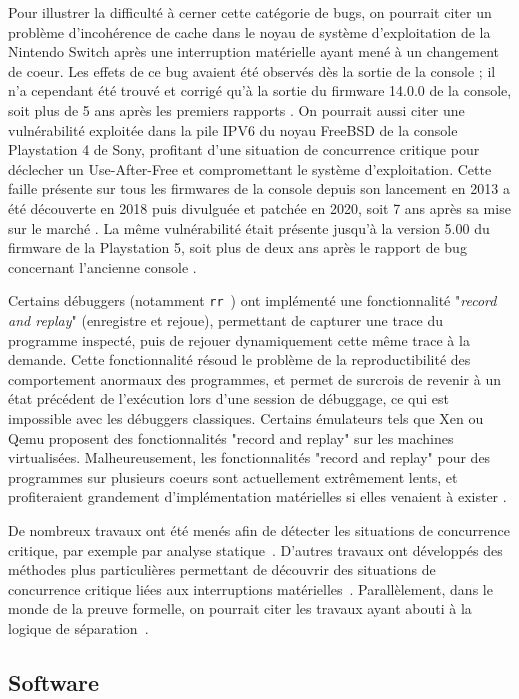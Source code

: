 Pour illustrer la difficulté à cerner cette catégorie de bugs, on pourrait citer un problème d'incohérence de cache dans le noyau de système d'exploitation de la Nintendo Switch après une interruption matérielle ayant mené à un changement de coeur. Les effets de ce bug avaient été observés dès la sortie de la console ; il n'a cependant été trouvé et corrigé qu'à la sortie du firmware 14.0.0 de la console, soit plus de 5 ans après les premiers rapports \cite{switchbug}.
On pourrait aussi citer une vulnérabilité exploitée dans la pile IPV6 du noyau FreeBSD de la console Playstation 4 de Sony, profitant d'une situation de concurrence critique pour déclecher un Use-After-Free et compromettant le système d'exploitation. Cette faille présente sur tous les firmwares de la console depuis son lancement en 2013 a été découverte en 2018 puis divulguée et patchée en 2020, soit 7 ans après sa mise sur le marché \cite{ps4bug}. La même vulnérabilité était présente jusqu'à la version 5.00 du firmware de la Playstation 5, soit plus de deux ans après le rapport de bug concernant l'ancienne console \cite{ps5bug}.

Certains débuggers (notamment \texttt{rr}~\cite{mozRR}) ont implémenté une fonctionnalité "\emph{record and replay}" (enregistre et rejoue), permettant de capturer une trace du programme inspecté, puis de rejouer dynamiquement cette même trace à la demande. Cette fonctionnalité résoud le problème de la reproductibilité des comportement anormaux des programmes, et permet de surcrois de revenir à un état précédent de l'exécution lors d'une session de débuggage, ce qui est impossible avec les débuggers classiques. Certains émulateurs tels que Xen ou Qemu proposent des fonctionnalités "record and replay" sur les machines virtualisées. Malheureusement, les fonctionnalités "record and replay" pour des programmes sur plusieurs coeurs sont actuellement extrêmement lents, et profiteraient grandement d'implémentation matérielles si elles venaient à exister \cite{mozRR}.

De nombreux travaux ont été menés afin de détecter les situations de concurrence critique, par exemple par analyse statique~\cite{racerX}. D'autres travaux ont développés des méthodes plus particulières permettant de découvrir des situations de concurrence critique liées aux interruptions matérielles~\cite{sdracer}. Parallèlement, dans le monde de la preuve formelle, on pourrait citer les travaux ayant abouti à la logique de séparation~\cite{separationlogic}.

		\subsection{Software}

